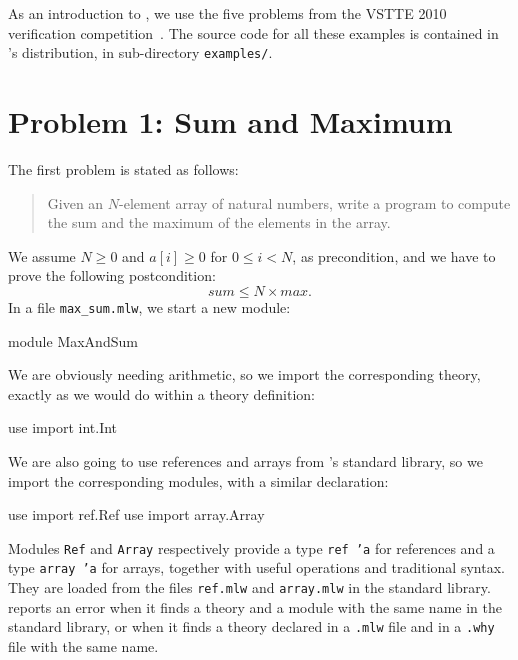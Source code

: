 \medskip
As an introduction to \whyml, we use the five problems from the VSTTE
2010 verification competition~\cite{vstte10comp}.
The source code for all these examples is contained in \why's
distribution, in sub-directory \texttt{examples/}.

\section{Problem 1: Sum and Maximum}
\label{sec:MaxAndSum}

The first problem is stated as follows:
\begin{quote}
  Given an $N$-element array of natural numbers,
  write a program to compute the sum and the maximum of the
  elements in the array.
\end{quote}
We  assume $N \ge 0$ and $a[i] \ge 0$ for $0 \le i < N$, as precondition,
and we have to prove the following postcondition:
\begin{displaymath}
  sum \le N \times max.
\end{displaymath}
In a file \verb|max_sum.mlw|, we start a new module:
\begin{whycode}
module MaxAndSum
\end{whycode}
We are obviously needing arithmetic, so we import the corresponding
theory, exactly as we would do within a theory definition:
\begin{whycode}
  use import int.Int
\end{whycode}
We are also going to use references and arrays from \whyml's standard
library, so we import the corresponding modules, with a similar
declaration:
\begin{whycode}
  use import ref.Ref
  use import array.Array
\end{whycode}
Modules \texttt{Ref} and \texttt{Array} respectively provide a type
\texttt{ref 'a} for references and a type \texttt{array 'a} for
arrays, together with useful
operations and traditional syntax. They are loaded from the \whyml
files \texttt{ref.mlw} and \texttt{array.mlw} in the standard library.
\why reports an error when it finds a theory and a module with
the same name in the standard library, or when it finds a theory
declared in a \texttt{.mlw} file and in a \texttt{.why} file with
the same name.

